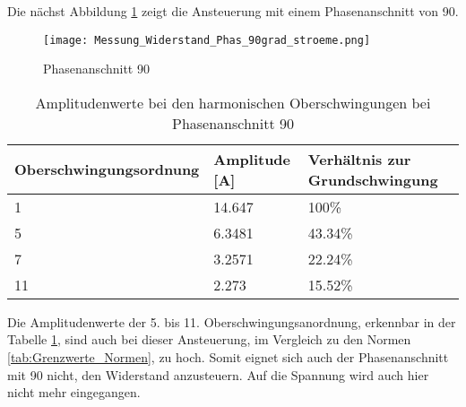 Die nächst Abbildung \ref{fig:Mess_Widerstand_Phas_90grad_stroeme} zeigt die Ansteuerung mit einem Phasenanschnitt von 90\textdegree \hspace{0.02cm}. 

\begin{figure}[ht!]
	\centering
	\texttt{[image: Messung\_Widerstand\_Phas\_90grad\_stroeme.png]}	
	\caption{Phasenanschnitt 90\textdegree}\label{fig:Mess_Widerstand_Phas_90grad_stroeme}
\end{figure}

\begin{table}[ht!]
	\centering
	\begin{tabular}{|l|l|l|}
		\hline
		Oberschwingungsordnung 	& Amplitude [A] & Verhältnis zur Grundschwingung	\\ \hline
		1       				& 14.647   		& 100\%								\\ \hline
		5      					& 6.3481    	& 43.34\%							\\ \hline
		7      					& 3.2571    	& 22.24\%							\\ \hline
		11      				& 2.273    		& 15.52\%							\\ \hline
	\end{tabular}
	\caption{Amplitudenwerte bei den harmonischen Oberschwingungen bei Phasenanschnitt 90\textdegree}\label{tab:Phas_90_Stroeme}
\end{table}

Die Amplitudenwerte der 5. bis 11. Oberschwingungsanordnung, erkennbar in der Tabelle \ref{tab:Phas_90_Stroeme}, sind auch bei dieser Ansteuerung, im Vergleich zu den Normen \ref{tab:Grenzwerte_Normen}, zu hoch. Somit eignet sich auch der Phasenanschnitt mit 90\textdegree \hspace{0.02cm} nicht, den Widerstand anzusteuern. Auf die Spannung wird auch hier nicht mehr eingegangen. 



